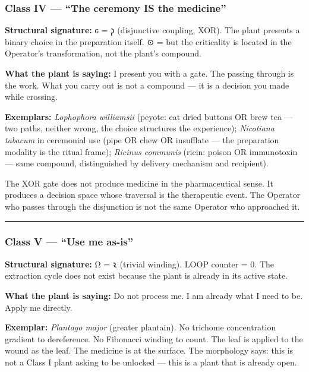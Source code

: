 \hypertarget{class-iv-the-ceremony-is-the-medicine}{%
\subsubsection{Class IV --- ``The ceremony IS the
medicine''}\label{class-iv-the-ceremony-is-the-medicine}}

\textbf{Structural signature:} ɢ = 𐑜 (disjunctive coupling, XOR). The
plant presents a binary choice in the preparation itself. ⊙ = \odot but
the criticality is located in the Operator's transformation, not the
plant's compound.

\textbf{What the plant is saying:} I present you with a gate. The
passing through is the work. What you carry out is not a compound --- it
is a decision you made while crossing.

\textbf{Exemplars:} \emph{Lophophora williamsii} (peyote: eat dried
buttons OR brew tea --- two paths, neither wrong, the choice structures
the experience); \emph{Nicotiana tabacum} in ceremonial use (pipe OR
chew OR insufflate --- the preparation modality is the ritual frame);
\emph{Ricinus communis} (ricin: poison OR immunotoxin --- same compound,
distinguished by delivery mechanism and recipient).

The XOR gate does not produce medicine in the pharmaceutical sense. It
produces a decision space whose traversal is the therapeutic event. The
Operator who passes through the disjunction is not the same Operator who
approached it.

\begin{center}\rule{0.5\linewidth}{0.5pt}\end{center}

\hypertarget{class-v-use-me-as-is}{%
\subsubsection{Class V --- ``Use me
as-is''}\label{class-v-use-me-as-is}}

\textbf{Structural signature:} Ω = 𐑷 (trivial winding). LOOP counter =
0. The extraction cycle does not exist because the plant is already in
its active state.

\textbf{What the plant is saying:} Do not process me. I am already what
I need to be. Apply me directly.

\textbf{Exemplar:} \emph{Plantago major} (greater plantain). No trichome
concentration gradient to dereference. No Fibonacci winding to count.
The leaf is applied to the wound as the leaf. The medicine is at the
surface. The morphology says: this is not a Class I plant asking to be
unlocked --- this is a plant that is already open.

